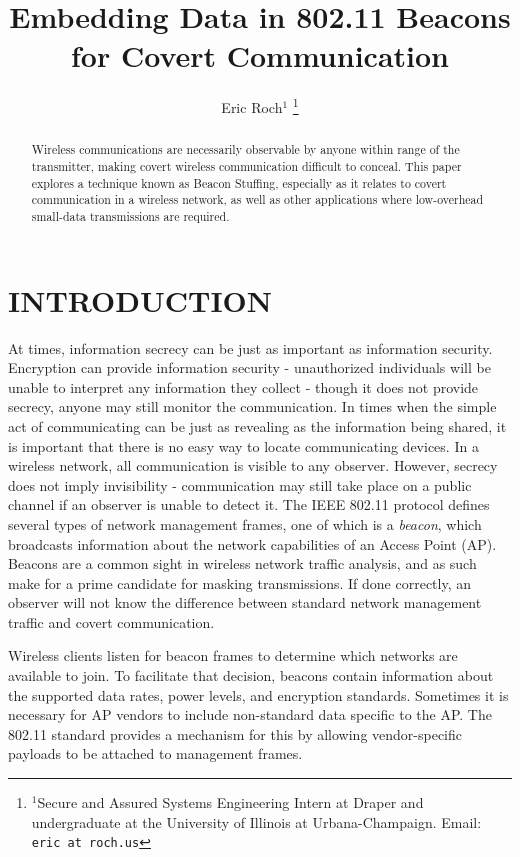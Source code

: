 \documentclass[letterpaper, 10 pt, conference]{ieeeconf}  %
\title{\LARGE \bf
Embedding Data in 802.11 Beacons for Covert Communication
}
\author{Eric Roch$^{1}$%
\thanks{$^{1}$Secure and Assured Systems Engineering Intern at Draper 
		and undergraduate at the University of Illinois at Urbana-Champaign. Email:
        {\tt\small eric at roch.us}}%
}
\begin{document}
\maketitle
\thispagestyle{empty}
\pagestyle{empty}


\begin{abstract}

Wireless communications are necessarily observable by anyone within range of the transmitter, making covert wireless communication difficult to conceal.  This paper explores a technique known as Beacon Stuffing, especially as it relates to covert communication in a wireless network, as well as other applications where low-overhead small-data transmissions are required.

\end{abstract}


\section{INTRODUCTION}

At times, information secrecy can be just as important as information security.  Encryption can provide information security - unauthorized individuals will be unable to interpret any information they collect - though it does not provide secrecy, anyone may still monitor the communication.  In times when the simple act of communicating can be just as revealing as the information being shared, it is important that there is no easy way to locate communicating devices.  In a wireless network, all communication is visible to any observer.  However, secrecy does not imply invisibility - communication may still take place on a public channel if an observer is unable to detect it.  The IEEE 802.11 protocol defines several types of network management frames, one of which is a \textit{beacon}, which broadcasts information about the network capabilities of an Access Point (AP).  Beacons are a common sight in wireless network traffic analysis, and as such make for a prime candidate for masking transmissions.  If done correctly, an observer will not know the difference between standard network management traffic and covert communication.

Wireless clients listen for beacon frames to determine which networks are available to join.  To facilitate that decision, beacons contain information about the supported data rates, power levels, and encryption standards. Sometimes it is necessary for AP vendors to include non-standard data specific to the AP.  The 802.11 standard provides a mechanism for this by allowing vendor-specific payloads to be attached to management frames. 
\end{document}
